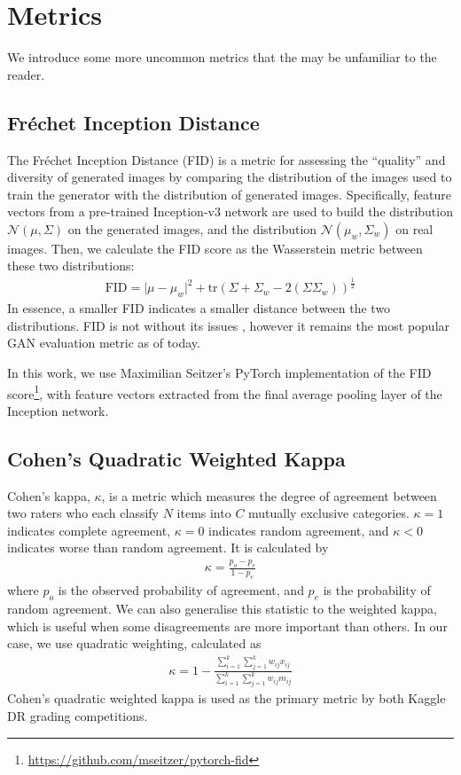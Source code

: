 \section{Metrics}

We introduce some more uncommon metrics that the may be unfamiliar to the reader.

\subsection{Fréchet Inception Distance}

The Fréchet Inception Distance (FID) \cite{fid} is a metric for assessing the ``quality'' and diversity of generated images by comparing the distribution of the images used to train the generator with the distribution of generated images.
Specifically, feature vectors from a pre-trained Inception-v3 network \cite{inceptionv3} are used to build the distribution $\mathcal{N}(\mu, \Sigma)$ on the generated images, and the distribution $\mathcal{N}(\mu_w, \Sigma_w)$ on real images. 
Then, we calculate the FID score as the Wasserstein metric between these two distributions:
\begin{align}
    \text{FID} = \lvert \mu - \mu_w \rvert^2 + \text{tr}(\Sigma + \Sigma_w - 2(\Sigma \Sigma_w))^\frac{1}{2}
\end{align}
In essence, a smaller FID indicates a smaller distance between the two distributions.
FID is not without its issues \cite{improved_precision}, however it remains the most popular GAN evaluation metric as of today.

In this work, we use Maximilian Seitzer's PyTorch implementation of the FID score\footnote{\url{https://github.com/mseitzer/pytorch-fid}}, with feature vectors extracted from the final average pooling layer of the Inception network.

\subsection{Cohen's Quadratic Weighted Kappa}

Cohen's kappa, $\kappa$, is a metric which measures the degree of agreement between two raters who each classify $N$ items into $C$ mutually exclusive categories.
$\kappa = 1$ indicates complete agreement, $\kappa = 0$ indicates random agreement, and $\kappa < 0$ indicates worse than random agreement.
It is calculated by
\begin{align}
    \kappa = \frac{p_o - p_e}{1 - p_e}
\end{align}
where $p_o$ is the observed probability of agreement, and $p_e$ is the probability of random agreement.
We can also generalise this statistic to the weighted kappa, which is useful when some disagreements are more important than others.
In our case, we use quadratic weighting, calculated as
\begin{align}
    \kappa = 1 - \frac{\sum_{i=1}^k \sum_{j=1}^k w_{ij}x_{ij}}{\sum_{i=1}^k \sum_{j=1}^k w_{ij} m_{ij}}
\end{align}
Cohen's quadratic weighted kappa is used as the primary metric by both Kaggle DR grading competitions.


